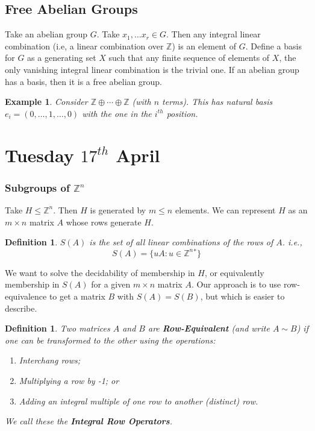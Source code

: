 \documentclass[a4paper,10pt]{article}
\newcommand{\ZZ}{\mathbb{Z}}
\newtheorem{Def}[thm]{Definition}
\newtheorem{eg}[thm]{Example}
\begin{document}
 
\subsection{Free Abelian Groups}

Take an abelian group $G$. Take $x_1, \dots x_r \in G$. Then any integral linear combination (i.e, a linear combination over $\ZZ$) is an element of $G$. Define a basis for $G$ as a generating set $X$ such that any finite sequence of elements of $X$, the only vanishing integral linear combination is the trivial one. If an abelian group has a basis, then it is a free abelian group.

\begin{eg}
Consider $\ZZ \oplus \cdots \oplus \ZZ$ (with $n$ terms). This has natural basis $e_i = (0, \dots, 1, \dots, 0)$ with the one in the $i^{th}$ position.
\end{eg}







\newpage

\section{Tuesday $17^{th}$ April}

\subsubsection{Subgroups of $\ZZ^n$}

Take $H \leq \ZZ^n$. Then $H$ is generated by $m \leq n$ elements. We can represent $H$ as an $m\times n$ matrix $A$ whose rows generate $H$. 

\begin{Def}
$S(A)$ is the set of all linear combinations of the rows of $A$. i.e.,
\[ S(A) = \{ uA : u \in \ZZ^n{}^* \} \]
\end{Def}

We want to solve the decidability of membership in $H$, or equivalently membership in $S(A)$ for a given $m \times n$ matrix $A$. Our approach is to use row-equivalence to get a matrix $B$ with $S(A) = S(B)$, but which is easier to describe.

\begin{Def}
Two matrices $A$ and $B$ are \textbf{Row-Equivalent} (and write $A \sim B$) if one can be transformed to the other using the operations:
\begin{enumerate}
\item Interchang  rows;
\item Multiplying a row by -1; or
\item Adding an integral multiple of one row to another (distinct) row.
\end{enumerate}
We call these the \textbf{Integral Row Operators}.
\end{Def}
 
\end{document}

